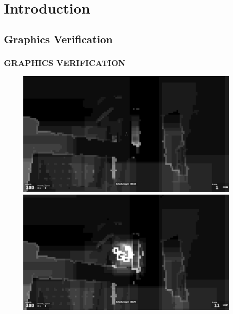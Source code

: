 \section{Introduction}

\subsection{Graphics Verification}
\begin{frame}
\frametitle{GRAPHICS VERIFICATION}

\begin{figure}[ht]
  \begin{minipage}[b]{0.3\linewidth}
    \centering
    \includegraphics[width=1.0\textwidth]{img/tbds1.png}
  \end{minipage}
  \hspace{0.25cm}
  \begin{minipage}[b]{0.3\linewidth}
    \centering
    \includegraphics[width=1.0\textwidth]{img/tbds2.png}
  \end{minipage}
  \hspace{0.25cm}

\end{figure}
\end{frame}
